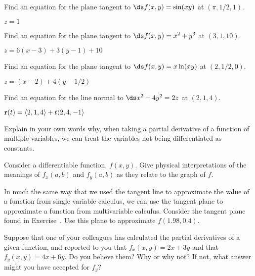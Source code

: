 \begin{exercises}
\begin{exercise} Find an equation for the plane tangent to 
$\ds f(x,y)=\sin(xy)$ at
$(\pi,1/2,1)$. 
\begin{answer} $z=1$
\end{answer}\end{exercise}

\begin{exercise} Find an equation for the plane tangent to 
$\ds f(x,y)=x^2+y^3$ at
$(3,1,10)$. 
\begin{answer} $z=6(x-3)+3(y-1)+10$
\end{answer}\end{exercise}

\begin{exercise} Find an equation for the plane tangent to 
$\ds f(x,y)=x\ln(xy)$ at
$(2,1/2,0)$. 
\label{ex:ln tan plane}
\begin{answer} $z=(x-2)+4(y-1/2)$
\end{answer}\end{exercise}

\begin{exercise} Find an equation for the line normal to 
$\ds x^2+4y^2=2z$ at
$(2,1,4)$. 
\begin{answer} ${\bf r}(t)=\langle 2,1,4\rangle+t\langle 2,4,-1\rangle$
\end{answer}\end{exercise}

\begin{exercise} Explain in your own words why, when taking a partial derivative
  of a function of multiple variables, we can treat the variables not
  being differentiated as constants.

\begin{exercise} Consider a differentiable function, $f(x,y)$.  Give physical
  interpretations of the meanings of $f_x(a,b)$ and $f_y(a,b)$ as they
  relate to the graph of $f$.

  \begin{exercise} In much the same way that we used the tangent line to
  approximate the value of a function from single variable calculus,
  we can use the tangent plane to approximate a function from
  multivariable calculus.  Consider the tangent plane found in
  Exercise~. Use this plane to approximate
  $f(1.98, 0.4)$.

\begin{exercise} Suppose that one of your colleagues has calculated the partial
  derivatives of a given function, and reported to you that
  $f_x(x,y)=2x+3y$ and that $f_y(x,y)=4x+6y$.  Do you believe them?
  Why or why not?  If not, what answer might you have accepted for
  $f_y$?


\end{exercise}
\end{exercise}
\end{exercise}
\end{exercise}
\end{exercises}

